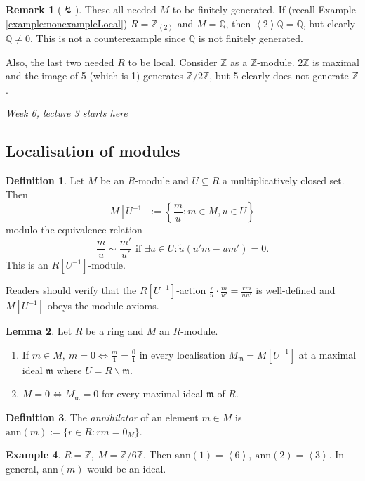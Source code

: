 \documentclass[a4paper]{article}
\newcommand{\la}{\left\langle}
\newcommand{\ra}{\right\rangle}
\newcommand{\Z}{\mathbb Z}
\newcommand{\Q}{\mathbb Q}
\newcommand{\m}{\mathfrak m}
\newcommand{\ann}{\text{ann}}
\theoremstyle{definition}
\newtheorem{defn}{Definition}[subsection]
\newtheorem{lemma}[defn]{Lemma}
\newtheorem{example}[defn]{Example}
\newtheorem*{remark}{Remark}
\begin{document}
\begin{remark}[$\lightning$]
These all needed $M$ to be finitely generated. If (recall Example \ref{example:nonexampleLocal}) $R=\Z_{\la 2\ra}$ and $M=\Q$, then $\la 2\ra \Q=\Q$, but clearly $\Q\neq 0$. This is not a counterexample since $\Q$ is not finitely generated.

Also, the last two needed $R$ to be local. Consider $\Z$ as a $\Z$-module. $2\Z$ is maximal and the image of 5 (which is 1) generates $\Z/2\Z$, but 5 clearly does not generate $\Z$.
\end{remark}

\begin{flushright}
\textit{Week 6, lecture 3 starts here}
\end{flushright}

\subsection{Localisation of modules}
\begin{defn}
Let $M$ be an $R$-module and $U\subseteq R$ a multiplicatively closed set. Then
\[
M\left[U^{-1}\right]:=\left\{\frac{m}{u}:m\in M,u\in U\right\}
\]
modulo the equivalence relation
\[
\frac{m}{u}\sim \frac{m'}{u'} \text{ if } \exists \widetilde u\in U:\widetilde u (u'm-um')=0.
\]
This is an $R\left[U^{-1}\right]$-module.
\end{defn}
Readers should verify that the $R\left[U^{-1}\right]$-action $\frac{r}{u}\cdot \frac{m}{u'}=\frac{rm}{uu'}$ is well-defined and $M\left[U^{-1}\right]$ obeys the module axioms.

\begin{lemma}
Let $R$ be a ring and $M$ an $R$-module.
\begin{enumerate}
\item If $m\in M,\ m=0 \Leftrightarrow \frac{m}{1}= \frac{0}{1}$ in every localisation $M_{\m}=M[U^{-1}]$ at a maximal ideal $\m$ where $U=R\backslash \m$.
\item $M=0 \Leftrightarrow M_{\m}=0$ for every maximal ideal $\m$ of $R$. 
\end{enumerate}
\end{lemma}

\begin{defn}
The \textit{annihilator} of an element $m\in M$ is $\ann(m):=\{r\in R:rm=0_M\}$.
\end{defn}
\begin{example}
$R=\Z,\ M=\Z/6\Z$. Then $\ann(1)=\la 6\ra,\ \ann(2)=\la 3\ra$. In general, $\ann(m)$ would be an ideal.
\end{example}
\end{document}
